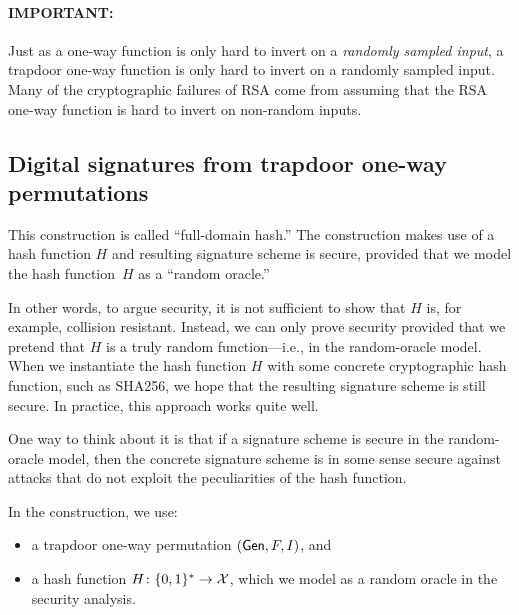 \paragraph{\textbf{IMPORTANT}:}
Just as a one-way function is only hard to invert on a \emph{randomly sampled input},
a trapdoor one-way function is only hard to invert on a randomly sampled input.
Many of the cryptographic failures of RSA come from assuming that the RSA
one-way function is hard to invert on non-random inputs.


\subsection{Digital signatures from trapdoor one-way permutations}

This construction is called ``full-domain hash.''\autocite{BR93}
The construction makes use of a hash function $H$ and resulting
signature scheme is secure, provided that we model the hash function~$H$
as a ``random oracle.''

In other words, to argue security, it is not sufficient to show that
$H$ is, for example, collision resistant.
Instead, we can only prove security provided that we pretend that $H$
is a truly random function---i.e., in the random-oracle model.
When we instantiate the hash function $H$ with some concrete cryptographic
hash function, such as SHA256, we hope that the resulting signature
scheme is still secure.
In practice, this approach works quite well.

One way to think about it is that if a signature scheme is secure
in the random-oracle model, then the concrete signature scheme
is in some sense secure against attacks that do not exploit the peculiarities
of the hash function.

\medskip 

In the construction, we use:
\begin{itemize}
  \item a trapdoor one-way permutation $(\mathsf{Gen}, F, I)$, and
  \item a hash function $H \colon \{0,1\}^* \to \mathcal{X}$,
        which we model as a random oracle in the
        security analysis.
\end{itemize}

